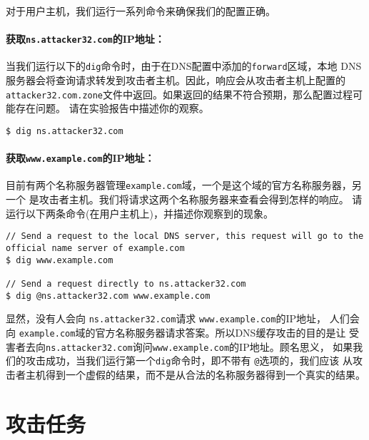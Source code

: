 对于用户主机，我们运行一系列命令来确保我们的配置正确。


\paragraph{获取\texttt{ns.attacker32.com}的IP地址：}
当我们运行以下的\texttt{dig}命令时，由于在DNS配置中添加的\texttt{forward}区域，本地
DNS服务器会将查询请求转发到攻击者主机。因此，响应会从攻击者主机上配置的
\texttt{attacker32.com.zone}文件中返回。如果返回的结果不符合预期，那么配置过程可能存在问题。
请在实验报告中描述你的观察。


\begin{lstlisting}
$ dig ns.attacker32.com
\end{lstlisting}



\paragraph{获取\texttt{www.example.com}的IP地址：} 
目前有两个名称服务器管理\texttt{example.com}域，一个是这个域的官方名称服务器，另一个
是攻击者主机。我们将请求这两个名称服务器来查看会得到怎样的响应。
请运行以下两条命令(在用户主机上)，并描述你观察到的现象。 


\begin{lstlisting}
// Send a request to the local DNS server, this request will go to the official name server of example.com
$ dig www.example.com

// Send a request directly to ns.attacker32.com
$ dig @ns.attacker32.com www.example.com
\end{lstlisting}
 


显然，没有人会向 \texttt{ns.attacker32.com}请求 \texttt{www.example.com}的IP地址，
人们会向 \texttt{example.com}域的官方名称服务器请求答案。所以DNS缓存攻击的目的是让
受害者去向\texttt{ns.attacker32.com}询问\texttt{www.example.com}的IP地址。顾名思义，
如果我们的攻击成功，当我们运行第一个\texttt{dig}命令时，即不带有 \texttt{@}选项的，我们应该
从攻击者主机得到一个虚假的结果，而不是从合法的名称服务器得到一个真实的结果。



\section{攻击任务}


